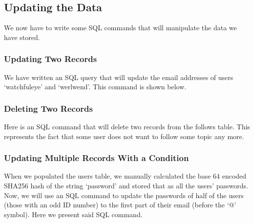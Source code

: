 \subsection{Updating the Data}

We now have to write some SQL commands that will manipulate the data we have stored.

\subsubsection{Updating Two Records}

We have written an SQL query that will update the email addresses of users `watchfuleye' and `werlwend'. This command is shown below.


\subsubsection{Deleting Two Records}

Here is an SQL command that will delete two records from the follows table. This represents the fact that some user does not want to follow some topic any more.


\subsubsection{Updating Multiple Records With a Condition}

When we populated the users table, we manually calculated the base 64 encoded SHA256 hash of the string `password' and stored that as all the users' passwords. Now, we will use an SQL command to update the passwords of half of the users (those with an odd ID number) to the first part of their email (before the `@' symbol). Here we present said SQL command.

